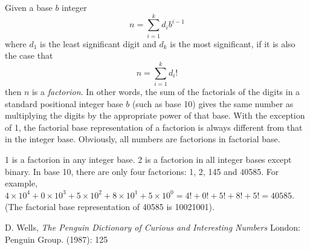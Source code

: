 \documentclass[12pt]{article}
\begin{document}
Given a base $b$ integer $$n = \sum_{i = 1}^k d_ib^{i - 1}$$ where $d_1$ is the least significant digit and $d_k$ is the most significant, if it is also the case that $$n = \sum_{i = 1}^k d_i!$$ then $n$ is a \emph{factorion}. In other words, the sum of the factorials of the digits in a standard positional integer base $b$ (such as base 10) gives the same number as multiplying the digits by the appropriate power of that base. With the exception of 1, the factorial base representation of a factorion is always different from that in the integer base. Obviously, all numbers are factorions in factorial base.

1 is a factorion in any integer base. 2 is a factorion in all integer bases except binary. In base 10, there are only four factorions: 1, 2, 145 and 40585. For example, $4 \times 10^4 + 0 \times 10^3 + 5 \times 10^2 + 8 \times 10^1 + 5 \times 10^0 = 4! + 0! + 5! + 8! + 5! = 40585$. (The factorial base representation of 40585 is 10021001).

\begin{thebibliography}{1}
 D. Wells, {\it The Penguin Dictionary of Curious and Interesting Numbers} London: Penguin Group. (1987): 125
\end{thebibliography}
\end{document}
